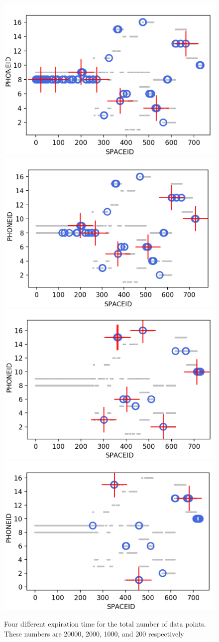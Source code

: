 \begin{figure}[!ht]
    \centering
        \includegraphics[width = 7.5 cm]{image/Chapters/Chapter6/DSAPalldays.png}\hfill
        \includegraphics[width = 7.5 cm]{image/Chapters/Chapter6/DSAPalldays2000fad.png}\hfill
        \includegraphics[width = 7.5 cm]{image/Chapters/Chapter6/DSAPalldays1000fad.png}\hfill
        \includegraphics[width = 7.5 cm]{image/Chapters/Chapter6/DSAPalldays200fad.png}\hfill
    \caption{Four different expiration time for the total number of data points. These numbers are 20000, 2000, 1000, and 200 respectively}
    \label{expirationchang}
\end{figure}

